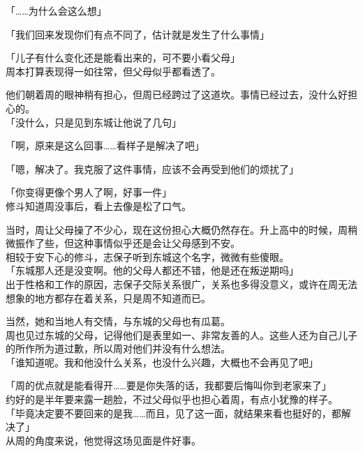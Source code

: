 「……为什么会这么想」

「我们回来发现你们有点不同了，估计就是发生了什么事情」

「儿子有什么变化还是能看出来的，可不要小看父母」\\

周本打算表现得一如往常，但父母似乎都看透了。

他们朝着周的眼神稍有担心，但周已经跨过了这道坎。事情已经过去，没什么好担心的。\\

「没什么，只是见到东城让他说了几句」

「啊，原来是这么回事……看样子是解决了吧」

「嗯，解决了。我克服了这件事情，应该不会再受到他们的烦扰了」

「你变得更像个男人了啊，好事一件」\\

修斗知道周没事后，看上去像是松了口气。

当时，周让父母操了不少心，现在这份担心大概仍然存在。升上高中的时候，周稍微振作了些，但这种事情似乎还是会让父母感到不安。\\

相较于安下心的修斗，志保子听到东城这个名字，微微有些傻眼。\\

「东城那人还是没变啊。他的父母人都还不错，他是还在叛逆期吗」\\

出于性格和工作的原因，志保子交际关系很广，关系也多得没意义，或许在周无法想象的地方都存在着关系，只是周不知道而已。

当然，她和当地人有交情，与东城的父母也有瓜葛。\\

周也见过东城的父母，记得他们是表里如一、非常友善的人。这些人还为自己儿子的所作所为道过歉，所以周对他们并没有什么想法。\\

「谁知道呢。我和他没什么关系，也没什么兴趣，大概也不会再见了吧」

「周的优点就是能看得开……要是你失落的话，我都要后悔叫你到老家来了」\\

约好的是半年要来露一趟脸，不过父母似乎也担心着周，有点小犹豫的样子。\\

「毕竟决定要不要回来的是我……而且，见了这一面，就结果来看也挺好的，都解决了」\\

从周的角度来说，他觉得这场见面是件好事。

